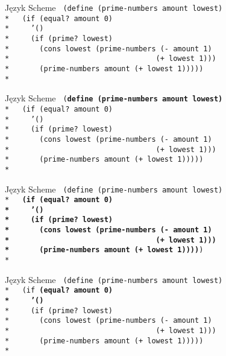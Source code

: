 \documentclass{beamer}
\begin{document}
\begin{frame}{Język Scheme}
  \texttt{
(define (prime-numbers amount lowest)\\*
\ \ (if (equal? amount 0)\\*
\ \ \ \ '()\\*
\ \ \ \ (if (prime? lowest)\\*
\ \ \ \ \ \ (cons lowest (prime-numbers (- amount 1)\\*
\ \ \ \ \ \ \ \ \ \ \ \ \ \ \ \ \
\ \ \ \ \ \ \ \ \ \ \ \ \ \ \ \ (+ lowest 1)))\\*
\ \ \ \ \ \ (prime-numbers amount (+ lowest 1)))))\\*
  }
\end{frame}

\begin{frame}{Język Scheme}
  \texttt{
(\textbf{define (prime-numbers amount lowest)}\\*
\ \ (if (equal? amount 0)\\*
\ \ \ \ '()\\*
\ \ \ \ (if (prime? lowest)\\*
\ \ \ \ \ \ (cons lowest (prime-numbers (- amount 1)\\*
\ \ \ \ \ \ \ \ \ \ \ \ \ \ \ \ \
\ \ \ \ \ \ \ \ \ \ \ \ \ \ \ \ (+ lowest 1)))\\*
\ \ \ \ \ \ (prime-numbers amount (+ lowest 1)))))\\*
  }
\end{frame}

\begin{frame}{Język Scheme}
  \texttt{
(define (prime-numbers amount lowest)\\*
\ \ \textbf{(if (equal? amount 0)\\*
\ \ \ \ '()\\*
\ \ \ \ (if (prime? lowest)\\*
\ \ \ \ \ \ (cons lowest (prime-numbers (- amount 1)\\*
\ \ \ \ \ \ \ \ \ \ \ \ \ \ \ \ \
\ \ \ \ \ \ \ \ \ \ \ \ \ \ \ \ (+ lowest 1)))\\*
\ \ \ \ \ \ (prime-numbers amount (+ lowest 1))))})\\*
  }
\end{frame}

\begin{frame}{Język Scheme}
  \texttt{
(define (prime-numbers amount lowest)\\*
\ \ (if \textbf{(equal? amount 0)\\*
\ \ \ \ '()}\\*
\ \ \ \ (if (prime? lowest)\\*
\ \ \ \ \ \ (cons lowest (prime-numbers (- amount 1)\\*
\ \ \ \ \ \ \ \ \ \ \ \ \ \ \ \ \
\ \ \ \ \ \ \ \ \ \ \ \ \ \ \ \ (+ lowest 1)))\\*
\ \ \ \ \ \ (prime-numbers amount (+ lowest 1)))))\\*
  }
\end{frame}
\end{document}
